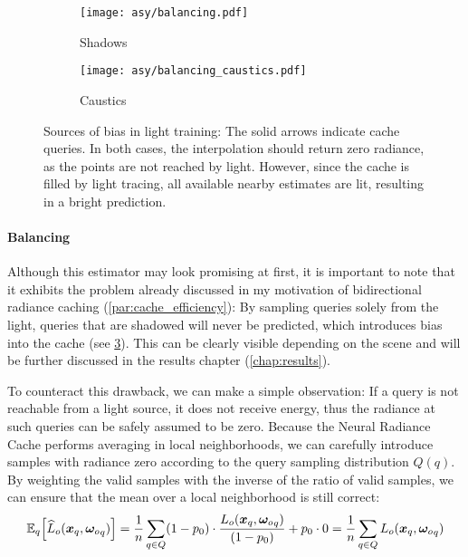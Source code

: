 \begin{figure}[htb!]
    \centering
    \begin{subfigure}{0.5\textwidth}
        \centering
        \texttt{[image: asy/balancing.pdf]}
        \caption{Shadows}
        \label{fig:balancing_shadows}
    \end{subfigure}%
    \begin{subfigure}{0.5\textwidth}
        \centering
        \texttt{[image: asy/balancing\_caustics.pdf]}
        \caption{Caustics}
        \label{fig:balancing_caustics}
    \end{subfigure}
    \caption{Sources of bias in light training: The solid arrows indicate cache queries. In both cases, the interpolation should return zero radiance, as the points are not reached by light. However, since the cache is filled by light tracing, all available nearby estimates are lit, resulting in a bright prediction.}
    \label{fig:balancing}
\end{figure}

\paragraph{Balancing} Although this estimator may look promising at first, it is important to note that it exhibits the problem already discussed in my motivation of bidirectional radiance caching (\cref{par:cache_efficiency}):
By sampling queries solely from the light, queries that are shadowed will never be predicted, which introduces bias into the cache (see \cref{fig:balancing}).
This can be clearly visible depending on the scene and will be further discussed in the results chapter (\cref{chap:results}).

To counteract this drawback, we can make a simple observation:
If a query is not reachable from a light source, it does not receive energy, thus the radiance at such queries can be safely assumed to be zero.
Because the Neural Radiance Cache performs averaging in local neighborhoods, we can carefully introduce samples with radiance zero according to the query sampling distribution $Q(q)$.
By weighting the valid samples with the inverse of the ratio of valid samples, we can ensure that the mean over a local neighborhood is still correct:
\begin{equation}
\expectationvar{q}{{\widehat{L}_o}(\vec{x}_q, \wo_q)} = \frac{1}{n} \sum_{q \in Q} (1 - p_0) \cdot \frac{L_o(\vec{x}_q, \wo_q)}{(1 - p_0)} + p_0 \cdot 0 = \frac{1}{n} \sum_{q \in Q} L_o(\vec{x}_q, \wo_q)
\end{equation}


